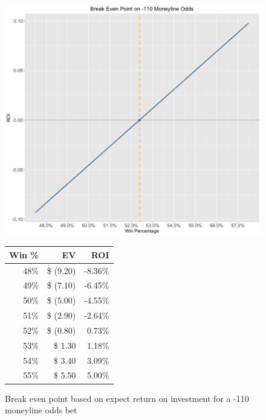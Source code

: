 \documentclass [MS] {uclathes}
\begin{document}
\begin{figure}
  \begin{minipage}[c]{0.75\linewidth}
    \vspace{0pt}
    \centering
     \includegraphics[width=4.5in]{break-even.png}
  \end{minipage}%
  \begin{minipage}[c]{0.10\linewidth}
    \vspace{0pt}
    \centering
    \footnotesize
        \begin{tabular}{@{}rrr@{}}
        \toprule
        Win \% & EV & ROI  \\ \midrule
        48\% & \$             (9.20) & -8.36\% \\
        49\% & \$             (7.10) & -6.45\% \\
        50\% & \$             (5.00) & -4.55\% \\
        51\% & \$             (2.90) & -2.64\% \\
        52\% & \$             (0.80) & 0.73\% \\
        53\% & \$              1.30 & 1.18\% \\
        54\% & \$              3.40 & 3.09\% \\
        55\% & \$              5.50 & 5.00\% \\
         \bottomrule
        \end{tabular}
   \end{minipage}
   \caption{Break even point based on expect return on investment for a -110 moneyline odds bet}
   \label{fig:exp-val}
\end{figure}
\end{document}
